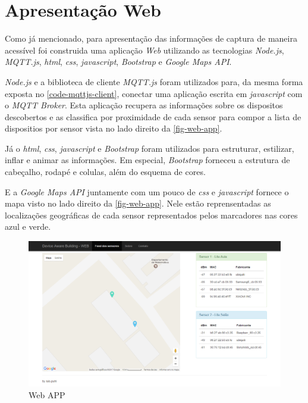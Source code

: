\section{Apresentação Web}
\label{sec:app-web}

Como já mencionado, para apresentação das informações de captura de maneira
acessível foi construida uma aplicação \emph{Web} utilizando as tecnologias
\emph{Node.js}, \emph{MQTT.js}, \emph{html}, \emph{css}, \emph{javascript},
\emph{Bootstrap} e \emph{Google Maps API}.

\emph{Node.js} e a biblioteca de cliente \emph{MQTT.js} foram utilizados para,
da mesma forma exposta no \autoref{code-mqttjs-client}, conectar
uma aplicação escrita em \emph{javascript} com o \emph{MQTT Broker}. Esta
aplicação recupera as informações sobre os dispositos descobertos e as
classifica por proximidade de cada sensor para compor a lista de dispositios
por sensor vista no lado direito da \autoref{fig-web-app}.

Já o \emph{html}, \emph{css}, \emph{javascript} e \emph{Bootstrap} foram
utilizados para estruturar, estilizar, inflar e animar as informações. Em
especial, \emph{Bootstrap} forneceu a estrutura de cabeçalho, rodapé e colulas,
além do esquema de cores.

E a \emph{Google Maps API} juntamente com um pouco de \emph{css} e
\emph{javascript} fornece o mapa visto no lado direito da \autoref{fig-web-app}.
Nele estão reprensentadas as localizações geográficas de cada sensor
representados pelos marcadores nas cores azul e verde.

\begin{figure}[htb]
	\caption{\label{fig-web-app}Web APP}
	\begin{center}
		\includegraphics[width=1\textwidth]{050-construcao/web-app.png}
	\end{center}
\end{figure}
